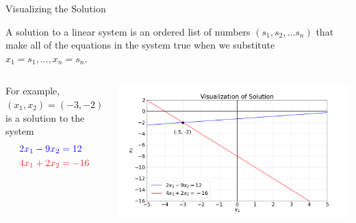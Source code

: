 \documentclass[xcolor=dvipsnames,aspectratio=169,t]{beamer}
\begin{document}
\begin{frame}{Visualizing the Solution}

  A \alert{solution} to a linear system is an ordered list of numbers $(s_1, s_2, \ldots s_n)$ that make \alert{all} of the equations in the system true when we substitute $x_1 = s_1, \ldots , x_n=s_n$.
  \bigskip
  
  \begin{columns}[T]
    \column{0.25\tw}
    For example, $(x_1,x_2)=(-3,-2)$ is a solution to the system
    \begin{align*}
      & \colorb{2x_1 -9x_2 = 12 }\\
      & \colorr{4x_1 +2x_2 =-16 }
    \end{align*}
   
    \column{0.75\tw}
    \vspace*{-1em}
    \includegraphics[width=0.925\tw]{images/fig-two-lines1.png}
  \end{columns}

\end{frame}
\end{document}
